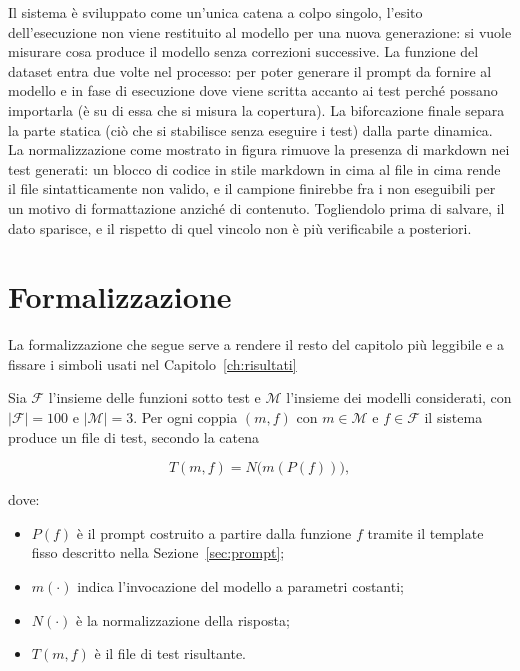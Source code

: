 Il sistema è sviluppato come un'unica catena a colpo singolo, l'esito dell'esecuzione non viene restituito al modello per una nuova generazione: si vuole misurare cosa produce il modello senza correzioni successive. La funzione del dataset entra due volte nel processo: per poter generare il prompt da fornire al modello e in fase di esecuzione dove viene scritta accanto ai test perché possano importarla (è su di essa che si misura la copertura).
La biforcazione finale separa la parte statica (ciò che si stabilisce senza eseguire i test) dalla parte dinamica. La normalizzazione come mostrato in figura rimuove la presenza di markdown nei test generati: un blocco di codice in stile markdown in cima al file in cima rende il file sintatticamente non valido, e il campione finirebbe fra i non eseguibili per un motivo di formattazione anziché di contenuto. Togliendolo prima di salvare, il dato sparisce, e il rispetto di quel vincolo non è più verificabile a posteriori.


\section{Formalizzazione}
\label{sec:formalizzazione}

La formalizzazione che segue serve a rendere il resto del capitolo più leggibile e a fissare i simboli usati nel Capitolo~\ref{ch:risultati}

Sia $\mathcal{F}$ l'insieme delle funzioni sotto test e $\mathcal{M}$ l'insieme
dei modelli considerati, con $|\mathcal{F}| = 100$ e $|\mathcal{M}| = 3$. Per
ogni coppia $(m, f)$ con $m \in \mathcal{M}$ e $f \in \mathcal{F}$ il sistema
produce un file di test, secondo la catena

\begin{equation}
T(m, f) = N\bigl(m(P(f))\bigr),
\label{eq:catena}
\end{equation}

dove:

\begin{itemize}
  \item $P(f)$ è il prompt costruito a partire dalla funzione $f$ tramite il
        template fisso descritto nella Sezione~\ref{sec:prompt};
  \item $m(\cdot)$ indica l'invocazione del modello a parametri costanti;
  \item $N(\cdot)$ è la normalizzazione della risposta;
  \item $T(m, f)$ è il file di test risultante.
\end{itemize}

